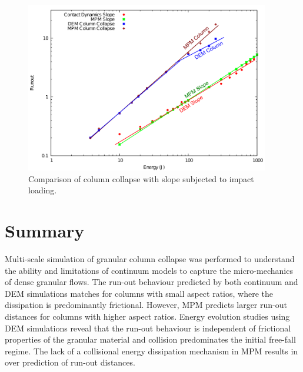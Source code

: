 \begin{figure}[tbhp]
\centering
\includegraphics[width=0.95\textwidth]{Slope_Column}
\caption{Comparison of column collapse with slope subjected to impact loading.}
\label{fig:Slope_Column}
\end{figure}

\section{Summary}
Multi-scale simulation of granular column collapse was performed to understand 
the ability and limitations of continuum models to capture the micro-mechanics 
of dense granular flows. The run-out behaviour predicted by both continuum and 
DEM simulations matches for columns with small aspect ratios, where the 
dissipation is predominantly frictional. However, MPM predicts larger run-out 
distances for columns with higher aspect ratios. Energy evolution studies using 
DEM simulations reveal that the run-out behaviour is independent of frictional 
properties of the granular material and collision predominates the initial 
free-fall regime. The lack of a collisional energy dissipation mechanism in MPM 
results in over prediction of run-out distances. 